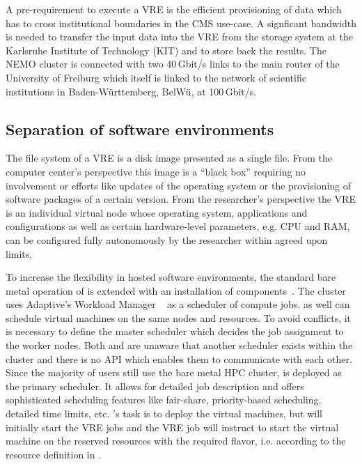 A pre-requirement to execute a VRE is the efficient
provisioning of data which has to cross institutional boundaries in the CMS use-case.
A signficant bandwidth is needed to transfer the input data into the VRE from the storage system at
the Karlsruhe Institute of Technology (KIT) and to store back the results. The
NEMO cluster is connected with two 40\,Gbit/s links to the main router of the
University of Freiburg which itself is linked to the network of
scientific institutions in Baden-W\"urttemberg, BelW\"u, at
100\,Gbit/s.

\subsection{Separation of software environments}

The file system of a VRE is a
disk image presented as a single file. From the computer center's perspective
this image is a ``black box'' requiring no involvement or efforts like
updates of the operating system or the provisioning of software packages of a
certain version. From the researcher's perspective the VRE is an individual
virtual node whose operating system, applications and configurations
as well as certain hardware-level parameters, e.g. CPU and RAM, can be
configured fully autonomously by the researcher within agreed upon limits.


To increase the flexibility in hosted software environments, the standard bare metal
operation of \NEMO is extended with an installation of \Openstack
components~\cite{hpc-symp:2016}.
The \NEMO cluster uses Adaptive's Workload Manager \Moab~\cite{Moab} as a
scheduler of compute jobs.
\Openstack as well can schedule virtual machines on the same nodes and
resources.
To avoid conflicts, it is necessary to define the master scheduler
which decides the job assignment to the worker nodes.
Both \Moab and \Openstack are
unaware that another scheduler exists within the cluster and there is
no API which enables them to  communicate with each other. Since the majority of users still use the
bare metal HPC cluster, \Moab is deployed as the primary scheduler. It allows for
detailed job description and offers sophisticated scheduling features like
fair-share, priority-based scheduling, detailed time limits,
etc. \Openstack 's task is to deploy the virtual machines, but \Moab will initially start the VRE
jobs and the VRE job will instruct \Openstack to start the virtual machine on the
reserved resources with the required flavor, i.e. according to the resource definition in \Openstack.

